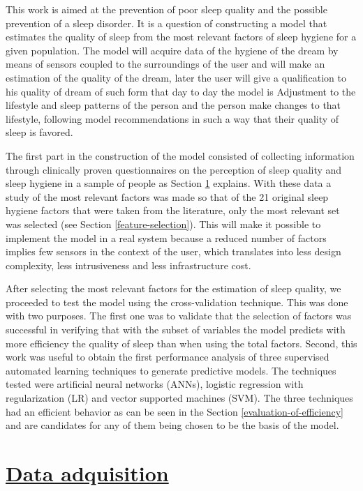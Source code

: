 \documentclass[]{book}
\begin{document}
This work is aimed at the prevention of poor sleep quality and the
possible prevention of a sleep disorder. It is a question of
constructing a model that estimates the quality of sleep from the most
relevant factors of sleep hygiene for a given population. The model will
acquire data of the hygiene of the dream by means of sensors coupled to
the surroundings of the user and will make an estimation of the quality
of the dream, later the user will give a qualification to his quality of
dream of such form that day to day the model is Adjustment to the
lifestyle and sleep patterns of the person and the person make changes
to that lifestyle, following model recommendations in such a way that
their quality of sleep is favored.

The first part in the construction of the model consisted of collecting
information through clinically proven questionnaires on the perception
of sleep quality and sleep hygiene in a sample of people as Section
\ref{data-adquisition} explains. With these data a study of the most
relevant factors was made so that of the 21 original sleep hygiene
factors that were taken from the literature, only the most relevant set
was selected (see Section \ref{feature-selection}). This will make it
possible to implement the model in a real system because a reduced
number of factors implies few sensors in the context of the user, which
translates into less design complexity, less intrusiveness and less
infrastructure cost.

After selecting the most relevant factors for the estimation of sleep
quality, we proceeded to test the model using the cross-validation
technique. This was done with two purposes. The first one was to
validate that the selection of factors was successful in verifying that
with the subset of variables the model predicts with more efficiency the
quality of sleep than when using the total factors. Second, this work
was useful to obtain the first performance analysis of three supervised
automated learning techniques to generate predictive models. The
techniques tested were artificial neural networks (ANNs), logistic
regression with regularization (LR) and vector supported machines (SVM).
The three techniques had an efficient behavior as can be seen in the
Section \ref{evaluation-of-efficiency} and are candidates for any of
them being chosen to be the basis of the model.

\hypertarget{data-adquisition}{\chapter{\texorpdfstring{\protect\hyperlink{data-adquisition}{Data
adquisition}}{Data adquisition}}\label{data-adquisition}}
\end{document}
